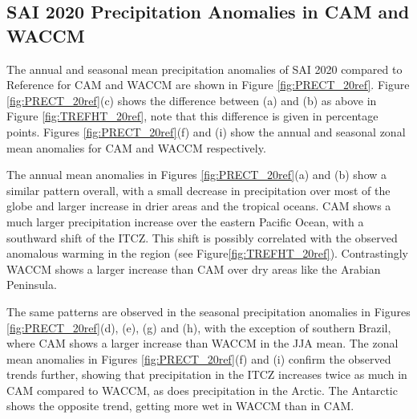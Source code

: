 \subsection{SAI 2020 Precipitation Anomalies in CAM and WACCM}
The annual and seasonal mean precipitation anomalies of SAI 2020 compared to Reference for CAM and WACCM are shown in Figure \ref{fig:PRECT_20ref}. Figure \ref{fig:PRECT_20ref}(c) shows the difference between (a) and (b) as above in Figure \ref{fig:TREFHT_20ref}, note that this difference is given in percentage points. Figures \ref{fig:PRECT_20ref}(f) and (i) show the annual and seasonal zonal mean anomalies for CAM and WACCM respectively.

The annual mean anomalies in Figures \ref{fig:PRECT_20ref}(a) and (b) show a similar pattern overall, with a small decrease in precipitation over most of the globe and larger increase in drier areas and the tropical oceans. CAM shows a much larger precipitation increase over the eastern Pacific Ocean, with a southward shift of the ITCZ. This shift is possibly correlated with the observed anomalous warming in the region (see Figure\ref{fig:TREFHT_20ref}). Contrastingly WACCM shows a larger increase than CAM over dry areas like the Arabian Peninsula.

The same patterns are observed in the seasonal precipitation anomalies in Figures \ref{fig:PRECT_20ref}(d), (e), (g) and (h), with the exception of southern Brazil, where CAM shows a larger increase than WACCM in the JJA mean. The zonal mean anomalies in Figures \ref{fig:PRECT_20ref}(f) and (i) confirm the observed trends further, showing that precipitation in the ITCZ increases twice as much in CAM compared to WACCM, as does precipitation in the Arctic. The Antarctic shows the opposite trend, getting more wet in WACCM than in CAM.


